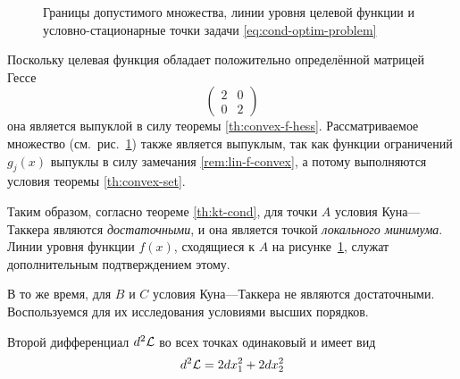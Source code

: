 \begin{figure}[!h]
  \centering
  \caption[Cтационарные точки задачи условной оптимизации]{Границы
    допустимого множества, линии уровня целевой функции и
    условно-стационарные точки задачи \eqref{eq:cond-optim-problem}}
  \label{fig:cond-optim}
\end{figure}

Поскольку целевая функция обладает положительно определённой матрицей
Гессе
\begin{equation}
  \label{eq:cond-optim-hess}
  \begin{pmatrix}
    2 & 0 \\
    0 & 2
  \end{pmatrix}
\end{equation}
она является выпуклой в силу теоремы \ref{th:convex-f-hess}.
Рассматриваемое множество (см. рис. \ref{fig:cond-optim}) также
является выпуклым, так как функции ограничений $g_j(x)$ выпуклы в силу
замечания \ref{rem:lin-f-convex}, а потому выполняются условия теоремы
\ref{th:convex-set}.

Таким образом, согласно теореме \ref{th:kt-cond}, для точки $A$
условия Куна—Таккера являются \emph{достаточными}, и она является
точкой \emph{локального минимума}. Линии уровня функции $f(x)$,
сходящиеся к $A$ на рисунке \ref{fig:cond-optim}, служат
дополнительным подтверждением этому.

В то же время, для $B$ и $C$ условия Куна—Таккера не являются
достаточными. Воспользуемся для их исследования условиями высших
порядков.

Второй дифференциал $d^2\mathcal{L}$ во всех точках одинаковый и имеет вид
\begin{equation}
  \label{eq:la-diff}
  d^2\mathcal{L} = 2dx_1^2 + 2 dx_2^2
\end{equation}

